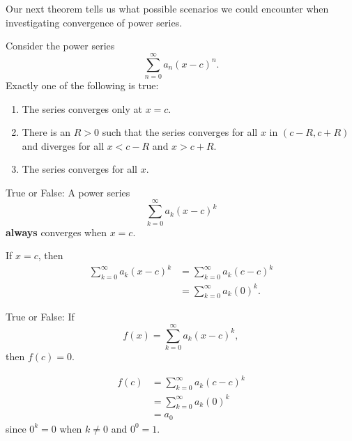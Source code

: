 \documentclass{ximera}
\begin{document}
Our next theorem tells us what possible scenarios we could encounter
when investigating convergence of power series.

\begin{theorem}
  Consider the power series
  \[
  \sum_{n=0}^\infty a_n(x-c)^n.
  \]
  Exactly one of the following is true:
\begin{enumerate}
\item The series converges only at $x=c$.
\item There is an $R>0$ such that the series converges for all $x$ in	
  $(c-R,c+R)$ and diverges for all $x<c-R$ and $x>c+R$.
\item The series converges for all $x$.
\end{enumerate}
\end{theorem}

\begin{question}
  True or False: A power series
  \[
  \sum_{k=0}^\infty a_k(x-c)^k
  \]
  \textbf{always} converges when $x=c$.
  \begin{prompt}
    \begin{multipleChoice}
    \end{multipleChoice}
  \end{prompt}
  \begin{feedback}
    If $x=c$, then
    \begin{align*}
      \sum_{k=0}^\infty a_k(x-c)^k &= \sum_{k=0}^\infty a_k(c-c)^k \\
      &= \sum_{k=0}^\infty a_k(0)^k.
    \end{align*}
  \end{feedback}
  \begin{question}
    True or False: If 
    \[
    f(x) = \sum_{k=0}^\infty a_k(x-c)^k,
    \]
    then $f(c) = 0$. 
  \begin{prompt}
    \begin{multipleChoice}
    \end{multipleChoice}
  \end{prompt}
  \begin{feedback}
    \begin{align*}
      f(c) &= \sum_{k=0}^\infty a_k(c-c)^k \\
      &= \sum_{k=0}^\infty a_k(0)^k\\
      &= a_0
    \end{align*}
    since $0^k = 0$ when $k\ne 0$ and $0^0 = 1$.
  \end{feedback} 
\end{question}
\end{question}
\end{document}
